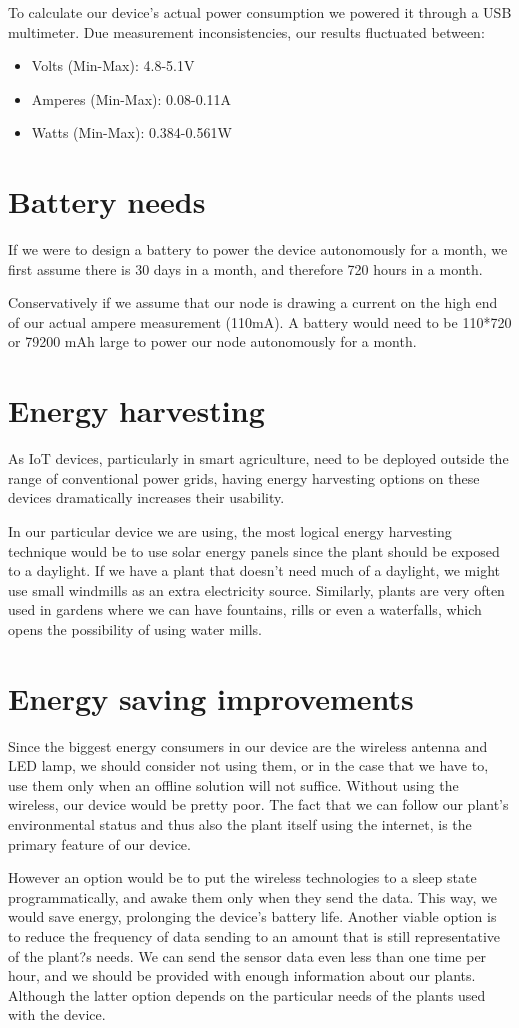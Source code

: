 \documentclass[10pt]{sensys-proc}
\begin{document}
To calculate our device's actual power consumption we powered it through a USB multimeter. Due measurement inconsistencies, our results fluctuated between: 
\begin{itemize}
  \item Volts (Min-Max): 4.8-5.1V
  \item Amperes (Min-Max): 0.08-0.11A 
  \item Watts (Min-Max): 0.384-0.561W 
\end{itemize}
\bigskip
\section{Battery needs}
If we were to design a battery to power the device autonomously for a month, we first assume there is 30 days in a month, and therefore 720 hours in a month. 

Conservatively if we assume that our node is drawing a current on the high end of our actual ampere measurement (110mA). A battery would need to be 110*720 or 79200 mAh large to power our node autonomously for a month. 
\bigskip
\section{Energy harvesting}
As IoT devices, particularly in smart agriculture, need to be deployed outside the range of conventional power grids, having energy harvesting options on these devices dramatically increases their usability.
 
In our particular device we are using, the most logical energy harvesting technique would be to use solar energy panels since the plant should be exposed to a daylight. If we have a plant that doesn't need much of a daylight, we might use small windmills as an extra electricity source. Similarly, plants are very often used in gardens where we can have fountains, rills or even a waterfalls, which opens the possibility  of using water mills.
\bigskip
\section{Energy saving improvements}
Since the biggest energy consumers in our device are the wireless antenna and LED lamp, we should consider not using them, or in the case that we have to, use them only when an offline solution will not suffice. Without using the wireless, our device would be pretty poor. The fact that we can follow our plant's environmental status and thus also the plant itself using the internet, is the primary feature of our device. 

However an option would be to put the wireless technologies to a sleep state programmatically, and awake them only when they send the data. This way, we would save energy, prolonging the device's battery life. Another viable option is to reduce the frequency of data sending to an amount that is still representative of the plant?s needs. We can send the sensor data even less than one time per hour, and we should be provided with enough information about our plants. Although the latter option depends on the particular needs of the plants used with the device. 
\bigskip
\balance

\end{document}
